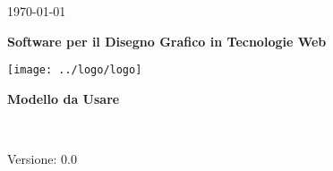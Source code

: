 
\title{\TITOLODOC}
\author{Piero Bizzotto}



\renewcommand{\insertversion}{0.0} %
\renewcommand{\TITOLODOC}{Modello da Usare} %
\renewcommand{\glosspath}{.\glossario} %

\begin{titlepage}
\begin{center}
	\begin{Large}	\today \end{Large}
\end{center}

\vspace{20pt}

\begin{center}
	\begin{Huge}
				\textbf{\ajax}
	\end{Huge}
\end{center}			

\begin{center}
	\begin{large}
				\textbf{Software per il Disegno Grafico in Tecnologie Web}
	\end{large}
\end{center}			

\vspace{20pt}

\begin{center}
\texttt{[image: ../logo/logo]}
\end{center}

\vspace{170pt}
\begin{center} %
	\begin{Huge}
				\textbf{\TITOLODOC}
	\end{Huge}
			\\
\end{center}
\vspace{210pt}
\begin{center}
Versione: \insertversion
\end{center}
\end{titlepage}

\newpage


